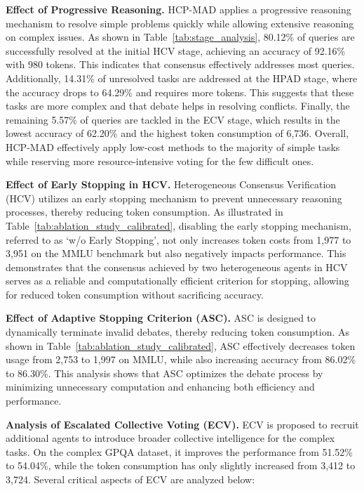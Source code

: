 \documentclass[11pt]{article}
\begin{document}
\noindent\textbf{Effect of Progressive Reasoning.}
HCP-MAD applies a progressive reasoning mechanism to resolve simple problems quickly while allowing extensive reasoning on complex issues. 
As shown in Table~\ref{tab:stage_analysis}, 80.12\% of queries are successfully resolved at the initial HCV stage, achieving an accuracy of 92.16\% with 980 tokens. 
This indicates that consensus effectively addresses most queries. 
Additionally, 14.31\% of unresolved tasks are addressed at the HPAD stage, where the accuracy drops to 64.29\% and requires more tokens. 
This suggests that these tasks are more complex and that debate helps in resolving conflicts. 
Finally, the remaining 5.57\% of queries are tackled in the ECV stage, which results in the lowest accuracy of 62.20\% and the highest token consumption of 6,736. 
Overall, HCP-MAD effectively apply low-cost methods to the majority of simple tasks while reserving more resource-intensive voting for the few difficult ones.


\noindent\textbf{Effect of Early Stopping in HCV.} 
Heterogeneous Consensus Verification (HCV) utilizes an early stopping mechanism to prevent unnecessary reasoning processes, thereby reducing token consumption. 
As illustrated in Table~\ref{tab:ablation_study_calibrated}, disabling the early stopping mechanism, referred to as `w/o Early Stopping', not only increases token costs from 1,977 to 3,951 on the MMLU benchmark but also negatively impacts performance. 
This demonstrates that the consensus achieved by two heterogeneous agents in HCV serves as a reliable and computationally efficient criterion for stopping, allowing for reduced token consumption without sacrificing accuracy.

\noindent\textbf{Effect of Adaptive Stopping Criterion (ASC).} 
ASC is designed to dynamically terminate invalid debates, thereby reducing token consumption. 
As shown in Table~\ref{tab:ablation_study_calibrated}, ASC effectively decreases token usage from 2,753 to 1,997 on MMLU, while also increasing accuracy from 86.02\% to 86.30\%. 
This analysis shows that ASC optimizes the debate process by minimizing unnecessary computation and enhancing both efficiency and performance.

\noindent\textbf{Analysis of Escalated Collective Voting (ECV).} 
ECV is proposed to recruit additional agents to introduce broader collective intelligence for the complex tasks.
On the complex GPQA dataset, it improves the performance from 51.52\% to 54.04\%, while the token consumption has only slightly increased from 3,412 to 3,724.
Several critical aspects of ECV are analyzed below:
\end{document}
